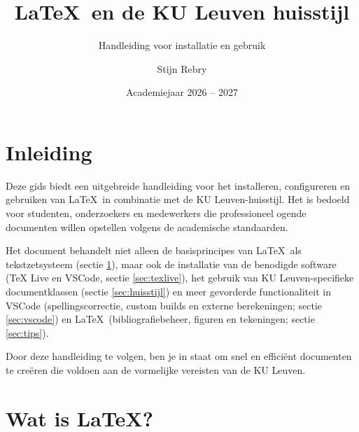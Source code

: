 \documentclass[kulak]{kulakarticle} %
\title{\LaTeX\ en de KU Leuven huisstijl}
\subtitle{Handleiding voor installatie en gebruik}
\author{Stijn Rebry}
\date{Academiejaar 2026 -- 2027}
\begin{document}
\maketitle

\tableofcontents

\section*{Inleiding}

Deze gids biedt een uitgebreide handleiding voor het installeren, configureren en gebruiken van \LaTeX\ in combinatie met de KU Leuven-huisstijl. Het is bedoeld voor studenten, onderzoekers en medewerkers die professioneel ogende documenten willen opstellen volgens de academische standaarden.

Het document behandelt niet alleen de basisprincipes van \LaTeX\ als tekstzetsysteem (sectie \ref{sec:latex}), maar ook de installatie van de benodigde software (TeX Live en VSCode, sectie \ref{sec:texlive}), het gebruik van KU Leuven-specifieke documentklassen (sectie \ref{sec:huisstijl}) en meer gevorderde functionaliteit in VSCode (spellingscorrectie, custom builds en externe berekeningen; sectie \ref{sec:vscode}) en \LaTeX\ (bibliografiebeheer, figuren en tekeningen; sectie \ref{sec:tips}).

Door deze handleiding te volgen, ben je in staat om snel en efficiënt documenten te creëren die voldoen aan de vormelijke vereisten van de KU Leuven.

\section{Wat is \LaTeX?}
\label{sec:latex}
\end{document}
